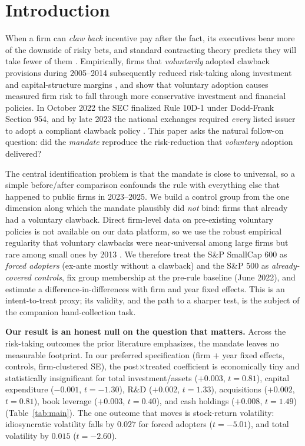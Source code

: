 \documentclass[12pt]{article}
\begin{document}
\newpage
\section{Introduction}
When a firm can \emph{claw back} incentive pay after the fact, its executives bear more of the
downside of risky bets, and standard contracting theory predicts they will take fewer of them
\citep{coles2006}. Empirically, firms that \emph{voluntarily} adopted clawback provisions
during 2005--2014 subsequently reduced risk-taking along investment and capital-structure
margins \citep{liu2020}, and \citet{babenko2023} show that voluntary adoption causes measured
firm risk to fall through more conservative investment and financial policies. In October 2022
the SEC finalized Rule 10D-1 under Dodd-Frank Section 954, and by late 2023 the national
exchanges required \emph{every} listed issuer to adopt a compliant clawback policy
\citep{sec2022}. This paper asks the natural follow-on question: did the \emph{mandate}
reproduce the risk-reduction that \emph{voluntary} adoption delivered?

The central identification problem is that the mandate is close to universal, so a simple
before/after comparison confounds the rule with everything else that happened to public firms
in 2023--2025. We build a control group from the one dimension along which the mandate plausibly
did \emph{not} bind: firms that already had a voluntary clawback. Direct firm-level data on
pre-existing voluntary policies is not available on our data platform, so we use the robust
empirical regularity that voluntary clawbacks were near-universal among large firms but rare
among small ones by 2013 \citep{babenko2023,chen2015}. We therefore treat the S\&P SmallCap 600
as \emph{forced adopters} (ex-ante mostly without a clawback) and the S\&P 500 as
\emph{already-covered controls}, fix group membership at the pre-rule baseline (June 2022), and
estimate a difference-in-differences with firm and year fixed effects. This is an
intent-to-treat proxy; its validity, and the path to a sharper test, is the subject of the
companion hand-collection task.

\textbf{Our result is an honest null on the question that matters.} Across the risk-taking
outcomes the prior literature emphasizes, the mandate leaves no measurable footprint. In our
preferred specification (firm $+$ year fixed effects, controls, firm-clustered SE), the
post$\times$treated coefficient is economically tiny and statistically insignificant for total
investment/assets ($+0.003$, $t=0.81$), capital expenditure ($-0.001$, $t=-1.30$), R\&D
($+0.002$, $t=1.33$), acquisitions ($+0.002$, $t=0.81$), book leverage ($+0.003$, $t=0.40$),
and cash holdings ($+0.008$, $t=1.49$) (Table~\ref{tab:main}). The one outcome that moves is
stock-return volatility: idiosyncratic volatility falls by $0.027$ for forced adopters
($t=-5.01$), and total volatility by $0.015$ ($t=-2.60$).
\end{document}

